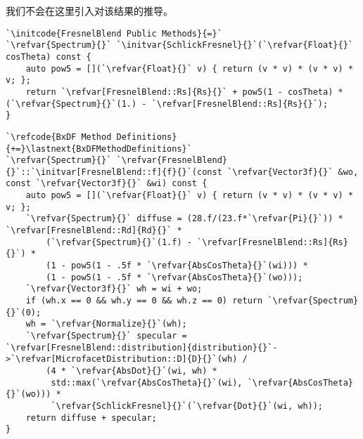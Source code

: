 我们不会在这里引入对该结果的推导。
\begin{lstlisting}
`\initcode{FresnelBlend Public Methods}{=}`
`\refvar{Spectrum}{}` `\initvar{SchlickFresnel}{}`(`\refvar{Float}{}` cosTheta) const {
    auto pow5 = [](`\refvar{Float}{}` v) { return (v * v) * (v * v) * v; };
    return `\refvar[FresnelBlend::Rs]{Rs}{}` + pow5(1 - cosTheta) * (`\refvar{Spectrum}{}`(1.) - `\refvar[FresnelBlend::Rs]{Rs}{}`);
}
\end{lstlisting}
\begin{lstlisting}
`\refcode{BxDF Method Definitions}{+=}\lastnext{BxDFMethodDefinitions}`
`\refvar{Spectrum}{}` `\refvar{FresnelBlend}{}`::`\initvar[FresnelBlend::f]{f}{}`(const `\refvar{Vector3f}{}` &wo, const `\refvar{Vector3f}{}` &wi) const {
    auto pow5 = [](`\refvar{Float}{}` v) { return (v * v) * (v * v) * v; };
    `\refvar{Spectrum}{}` diffuse = (28.f/(23.f*`\refvar{Pi}{}`)) * `\refvar[FresnelBlend::Rd]{Rd}{}` *
        (`\refvar{Spectrum}{}`(1.f) - `\refvar[FresnelBlend::Rs]{Rs}{}`) * 
        (1 - pow5(1 - .5f * `\refvar{AbsCosTheta}{}`(wi))) *
        (1 - pow5(1 - .5f * `\refvar{AbsCosTheta}{}`(wo)));
    `\refvar{Vector3f}{}` wh = wi + wo;
    if (wh.x == 0 && wh.y == 0 && wh.z == 0) return `\refvar{Spectrum}{}`(0);
    wh = `\refvar{Normalize}{}`(wh);
    `\refvar{Spectrum}{}` specular = `\refvar[FresnelBlend::distribution]{distribution}{}`->`\refvar[MicrofacetDistribution::D]{D}{}`(wh) /
        (4 * `\refvar{AbsDot}{}`(wi, wh) *
         std::max(`\refvar{AbsCosTheta}{}`(wi), `\refvar{AbsCosTheta}{}`(wo))) *
         `\refvar{SchlickFresnel}{}`(`\refvar{Dot}{}`(wi, wh));
    return diffuse + specular;
}
\end{lstlisting}
